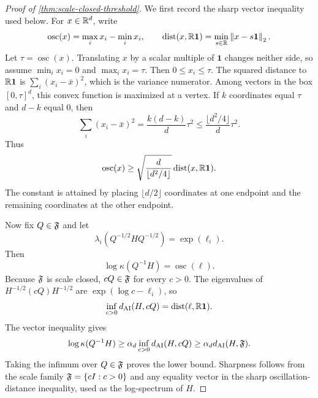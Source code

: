 \begin{proof}[Proof of \cref{thm:scale-closed-threshold}]
We first record the sharp vector inequality used below. For
\(x\in\mathbb R^d\), write
\[
  \operatorname{osc}(x)=\max_i x_i-\min_i x_i,\qquad
  \operatorname{dist}(x,\mathbb R\mathbf 1)=\min_{s\in\mathbb R}\left\lVert x-s\mathbf 1\right\rVert_2.
\]
Let \(\tau=\operatorname{osc}(x)\). Translating \(x\) by a scalar multiple of
\(\mathbf 1\) changes neither side, so assume \(\min_i x_i=0\) and
\(\max_i x_i=\tau\). Then \(0\le x_i\le\tau\). The squared distance to
\(\mathbb R\mathbf 1\) is \(\sum_i(x_i-\bar x)^2\), which is the variance numerator.
Among vectors in the box \([0,\tau]^d\), this convex function is maximized at a
vertex. If \(k\) coordinates equal \(\tau\) and \(d-k\) equal \(0\), then
\[
  \sum_i(x_i-\bar x)^2=\frac{k(d-k)}{d}\tau^2
  \le\frac{\lfloor d^2/4\rfloor}{d}\tau^2.
\]
Thus
\[
  \operatorname{osc}(x)
  \ge
  \sqrt{\frac{d}{\lfloor d^2/4\rfloor}}
  \operatorname{dist}(x,\mathbb R\mathbf 1).
\]
The constant is attained by placing \(\lfloor d/2\rfloor\) coordinates at one
endpoint and the remaining coordinates at the other endpoint.

Now fix \(Q\in\mathfrak F\) and let
\[
  \lambda_i(Q^{-1/2}HQ^{-1/2})=\exp(\ell_i).
\]
Then
\[
  \log\kappa(Q^{-1}H)=\operatorname{osc}(\ell).
\]
Because \(\mathfrak F\) is scale closed, \(cQ\in\mathfrak F\) for every \(c>0\). The eigenvalues
of \(H^{-1/2}(cQ)H^{-1/2}\) are \(\exp(\log c-\ell_i)\), so
\[
  \inf_{c>0}d_{\mathrm{AI}}(H,cQ)
  =
  \operatorname{dist}(\ell,\mathbb R\mathbf 1).
\]
The vector inequality gives
\[
  \log\kappa(Q^{-1}H)
  \ge
  \alpha_d\inf_{c>0}d_{\mathrm{AI}}(H,cQ)
  \ge
  \alpha_d d_{\mathrm{AI}}(H,\mathfrak F).
\]
Taking the infimum over \(Q\in\mathfrak F\) proves the lower bound. Sharpness follows
from the scale family \(\mathfrak F=\{cI:c>0\}\) and any equality vector in the sharp
oscillation-distance inequality, used as the log-spectrum of \(H\).
\end{proof}

